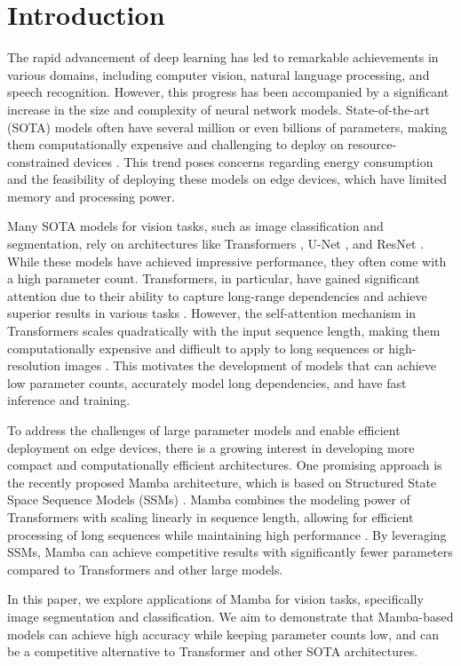 \documentclass[conference]{IEEEtran}
\begin{document}
\section{Introduction}
The rapid advancement of deep learning has led to remarkable achievements in various domains, including computer vision, natural language processing, and speech recognition. However, this progress has been accompanied by a significant increase in the size and complexity of neural network models. State-of-the-art (SOTA) models often have several million or even billions of parameters, making them computationally expensive and challenging to deploy on resource-constrained devices \cite{modelSize}. This trend poses concerns regarding energy consumption and the feasibility of deploying these models on edge devices, which have limited memory and processing power.

Many SOTA models for vision tasks, such as image classification and segmentation, rely on architectures like Transformers \cite{dosovitskiy2021image}, U-Net \cite{ronneberger2015unet}, and ResNet \cite{he2016deep}. While these models have achieved impressive performance, they often come with a high parameter count. Transformers, in particular, have gained significant attention due to their ability to capture long-range dependencies and achieve superior results in various tasks \cite{vaswani2017attention}. However, the self-attention mechanism in Transformers scales quadratically with the input sequence length, making them computationally expensive and difficult to apply to long sequences or high-resolution images \cite{choromanski2020rethinking}. This motivates the development of models that can achieve low parameter counts, accurately model long dependencies, and have fast inference and training.

To address the challenges of large parameter models and enable efficient deployment on edge devices, there is a growing interest in developing more compact and computationally efficient architectures. One promising approach is the recently proposed Mamba architecture, which is based on Structured State Space Sequence Models (SSMs) \cite{gu2022efficiently}. Mamba combines the modeling power of Transformers with scaling linearly in sequence length, allowing for efficient processing of long sequences while maintaining high performance \cite{gu2023mamba}. By leveraging SSMs, Mamba can achieve competitive results with significantly fewer parameters compared to Transformers and other large models.

In this paper, we explore applications of Mamba for vision tasks, specifically image segmentation and classification. We aim to demonstrate that Mamba-based models can achieve high accuracy while keeping parameter counts low, and can be a competitive alternative to Transformer and other SOTA architectures.
\end{document}
